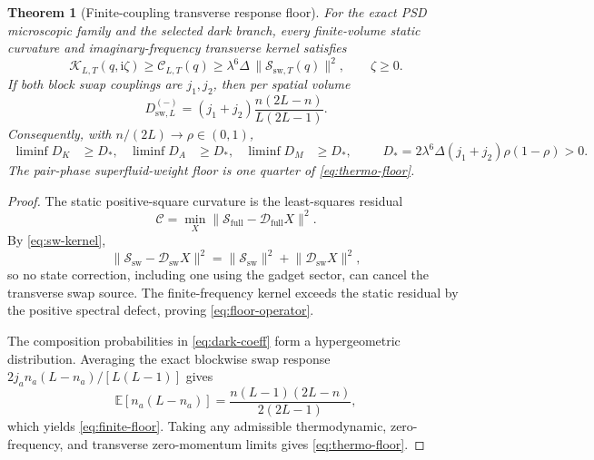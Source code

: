 \documentclass[11pt]{article}
\newtheorem{theorem}{Theorem}[section]
\theoremstyle{definition}
\theoremstyle{remark}
\newcommand{\cK}{\mathcal K}
\newcommand{\cC}{\mathcal C}
\newcommand{\cD}{\mathcal D}
\newcommand{\cS}{\mathcal S}
\newcommand{\norm}[1]{\lVert #1\rVert}
\newcommand{\I}{\mathrm i}
\begin{document}
\begin{theorem}[Finite-coupling transverse response floor]
\label{thm:floor}
For the exact PSD microscopic family and the selected dark branch, every finite-volume static curvature and imaginary-frequency transverse kernel satisfies
\begin{equation}
 \cK_{L,T}(q,\I\zeta)
 \ge\cC_{L,T}(q)
 \ge\lambda^6\Delta\,\norm{\cS_{\mathrm{sw},T}(q)}^2,
 \qquad \zeta\ge0.
 \label{eq:floor-operator}
\end{equation}
If both block swap couplings are $j_1,j_2$, then per spatial volume
\begin{equation}
 \boxed{
 D_{\mathrm{sw},L}^{(-)}
 =(j_1+j_2)\frac{n(2L-n)}{L(2L-1)}.}
 \label{eq:finite-floor}
\end{equation}
Consequently, with $n/(2L)\to\rho\in(0,1)$,
\begin{equation}
 \boxed{
 \begin{aligned}
  \liminf D_K&\ge D_*,&
  \liminf D_A&\ge D_*,&
  \liminf D_M&\ge D_*,
 \end{aligned}
 \qquad
 D_*=2\lambda^6\Delta(j_1+j_2)\rho(1-\rho)>0.}
 \label{eq:thermo-floor}
\end{equation}
The pair-phase superfluid-weight floor is one quarter of \eqref{eq:thermo-floor}.
\end{theorem}

\begin{proof}
The static positive-square curvature is the least-squares residual
\begin{equation}
 \cC=\min_X\norm{\cS_{\mathrm{full}}-\cD_{\mathrm{full}}X}^2.
\end{equation}
By \eqref{eq:sw-kernel},
\begin{equation}
 \norm{\cS_{\mathrm{sw}}-\cD_{\mathrm{sw}}X}^2
 =\norm{\cS_{\mathrm{sw}}}^2+\norm{\cD_{\mathrm{sw}}X}^2,
\end{equation}
so no state correction, including one using the gadget sector, can cancel the transverse swap source.  The finite-frequency kernel exceeds the static residual by the positive spectral defect, proving \eqref{eq:floor-operator}.

The composition probabilities in \eqref{eq:dark-coeff} form a hypergeometric distribution.  Averaging the exact blockwise swap response
$2j_an_a(L-n_a)/[L(L-1)]$ gives
\begin{equation}
 \mathbb E[n_a(L-n_a)]
 =\frac{n(L-1)(2L-n)}{2(2L-1)},
\end{equation}
which yields \eqref{eq:finite-floor}.  Taking any admissible thermodynamic, zero-frequency, and transverse zero-momentum limits gives \eqref{eq:thermo-floor}.
\end{proof}
\end{document}
